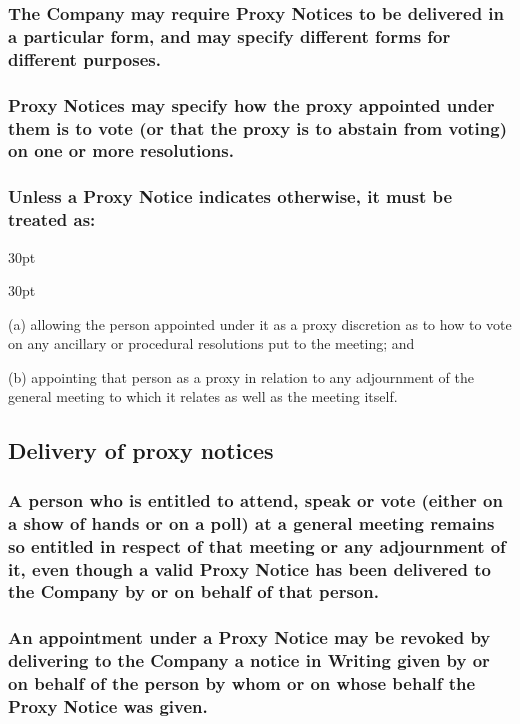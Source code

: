 \documentclass[12pt]{article}
\def\clauseindent{30pt}
\newenvironment{subindentlist}{\begin{adjustwidth}{\clauseindent}{}\begin{labeledlist}{\clauseindent}}{\end{labeledlist}\end{adjustwidth}}
\begin{document}
\subsubsection[Form of proxy notices]{The Company may require Proxy Notices to be delivered in a particular form, and may specify different forms for different purposes.}
\subsubsection[Directions contained in proxy notices]{Proxy Notices may specify how the proxy appointed under them is to vote (or that the proxy is to abstain from voting) on one or more resolutions.}
\subsubsection[Implication of proxy notices]{Unless a Proxy Notice indicates otherwise, it must be treated as:}
\begin{subindentlist}
    \item [(a)] allowing the person appointed under it as a proxy discretion as to how to vote on any ancillary or procedural resolutions put to the meeting; and
    \item [(b)] appointing that person as a proxy in relation to any adjournment of the general meeting to which it relates as well as the meeting itself.
\end{subindentlist}

\subsection{Delivery of proxy notices}
\subsubsection[Rights of Members represented by proxy]{A person who is entitled to attend, speak or vote (either on a show of hands or on a poll) at a general meeting remains so entitled in respect of that meeting or any adjournment of it, even though a valid Proxy Notice has been delivered to the Company by or on behalf of that person.}
\subsubsection[Revocation of proxy notices]{An appointment under a Proxy Notice may be revoked by delivering to the Company a notice in Writing given by or on behalf of the person by whom or on whose behalf the Proxy Notice was given.}
\end{document}
